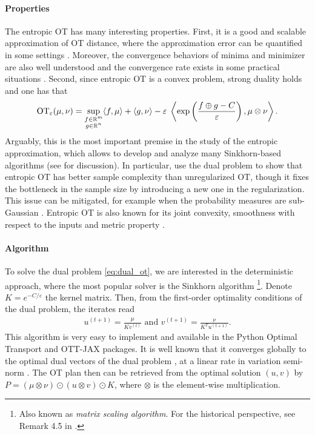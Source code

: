 \paragraph{Properties} The entropic OT has many interesting properties. First, it is a
good and scalable approximation of OT distance,
where the approximation error can be quantified in some settings \citep{Genevay19,Luise18}.
Moreover, the convergence behaviors of minima and minimizer are also well understood
\citep{Leonard12,Carlier17} and the convergence rate exists in some practical situations
\citep{Genevay19,Cominetti94,Weed18}.
Second, since entropic OT is a convex problem, strong duality holds and one has that
\begin{align}
  \label{eq:dual_ot}
  \text{OT}_{\varepsilon}(\mu, \nu) = \sup_{\substack{f \in \mathbb R^m \\ g \in \mathbb R^n}}
  \langle f, \mu \rangle + \langle g, \nu \rangle
  - \varepsilon \; \left\langle \exp \left( \frac{f \oplus g - C}{\varepsilon} \right), \mu \otimes \nu \right\rangle.
\end{align}
Arguably, this is the most important premise in the study of the entropic approximation, which
allows to develop and analyze many Sinkhorn-based algorithms (see  for discussion).
In particular, \citep{Genevay19} use the dual problem to show that entropic OT
has better sample complexity than unregularized OT,
though it fixes the bottleneck in the sample size by introducing a new one in the regularization.
This issue can be mitigated, for example when the probability measures are sub-Gaussian \citep{Mena19}.
Entropic OT is also known for its joint convexity, smoothness with respect to
the inputs \citep{Luise18} and metric property \citep{Sanjabi18}.

\paragraph{Algorithm} To solve the dual problem \eqref{eq:dual_ot},
we are interested in the deterministic approach, where the most popular solver
is the Sinkhorn algorithm \citep{Sinkhorn67}
\footnote{Also known as \textit{matrix scaling algorithm}.
For the historical perspective, see Remark 4.5 in \citep{Peyre19}.}.
Denote $K = e^{-C / \varepsilon}$ the kernel matrix. Then,
from the first-order optimality conditions of the dual problem, the iterates read
\begin{align}
  u^{(t+1)} = \frac{\mu}{Kv^{(t)}} \text{ and } v^{(t+1)} = \frac{\nu}{K^T u^{(t+1)}}.
\end{align}
This algorithm is very easy to implement and available in the Python Optimal Transport
\citep{Flamary21} and OTT-JAX \citep{Cuturi22} packages.
It is well known that it converges globally to the optimal dual vectors of the dual problem
\citep{Sinkhorn67}, at a linear rate in variation semi-norm \citep{Franklin89}.
The OT plan then can be retrieved from the optimal solution $(u, v)$ by
$P = (\mu \otimes \nu) \odot (u \otimes v) \odot K$,
where $\otimes$ is the element-wise multiplication.

